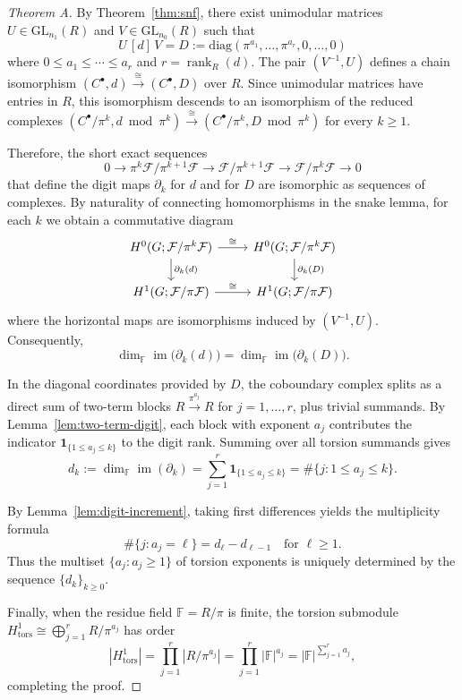 \documentclass[11pt]{amsart}
\theoremstyle{plain}
\theoremstyle{definition}
\newcommand{\Ring}{R}                          %
\newcommand{\unif}{\pi}                        %
\newcommand{\sheaf}[1]{\mathcal{#1}}                  %
\newcommand{\tors}{\mathrm{tors}}
\newcommand{\Digit}[1]{\partial_{#1}}%
\newcommand{\coboundary}{d}                           %
\DeclareMathOperator{\im}{im}                         %
\DeclareMathOperator{\rank}{rank}
\begin{document}
\begin{proof}[Theorem A]
By Theorem~\ref{thm:snf}, there exist unimodular matrices $U \in \mathrm{GL}_{n_1}(\Ring)$ and $V \in \mathrm{GL}_{n_0}(\Ring)$ such that
\[
U\,[\coboundary]\,V = D := \mathrm{diag}(\unif^{a_1}, \ldots, \unif^{a_r}, 0, \ldots, 0)
\]
where $0 \le a_1 \le \cdots \le a_r$ and $r = \rank_{\Ring}(\coboundary)$. The pair $(V^{-1}, U)$ defines a chain isomorphism $(C^\bullet, \coboundary) \xrightarrow{\cong} (C^\bullet, D)$ over $\Ring$. Since unimodular matrices have entries in $\Ring$, this isomorphism descends to an isomorphism of the reduced complexes $(C^\bullet/\unif^k, \coboundary \bmod \unif^k) \xrightarrow{\cong} (C^\bullet/\unif^k, D \bmod \unif^k)$ for every $k \ge 1$.

Therefore, the short exact sequences
\[
0 \to \unif^k\sheaf{F}/\unif^{k+1}\sheaf{F} \to \sheaf{F}/\unif^{k+1}\sheaf{F} \to \sheaf{F}/\unif^k\sheaf{F} \to 0
\]
that define the digit maps $\Digit{k}$ for $\coboundary$ and for $D$ are isomorphic as sequences of complexes. By naturality of connecting homomorphisms in the snake lemma, for each $k$ we obtain a commutative diagram
\[
\begin{tikzcd}
H^0(G;\sheaf{F}/\unif^k\sheaf{F}) \arrow{r}{\cong} \arrow{d}{\Digit{k}(\coboundary)} &
H^0(G;\sheaf{F}/\unif^k\sheaf{F}) \arrow{d}{\Digit{k}(D)} \\
H^1(G;\sheaf{F}/\unif\sheaf{F}) \arrow{r}{\cong} &
H^1(G;\sheaf{F}/\unif\sheaf{F})
\end{tikzcd}
\]
where the horizontal maps are isomorphisms induced by $(V^{-1}, U)$. Consequently,
\[
\dim_{\mathbb{F}} \im\bigl(\Digit{k}(\coboundary)\bigr) = \dim_{\mathbb{F}} \im\bigl(\Digit{k}(D)\bigr).
\]

In the diagonal coordinates provided by $D$, the coboundary complex splits as a direct sum of two-term blocks $\Ring \xrightarrow{\unif^{a_j}} \Ring$ for $j = 1, \ldots, r$, plus trivial summands. By Lemma~\ref{lem:two-term-digit}, each block with exponent $a_j$ contributes the indicator $\mathbf{1}_{\{1 \le a_j \le k\}}$ to the digit rank. Summing over all torsion summands gives
\[
d_k := \dim_{\mathbb{F}} \im(\Digit{k}) = \sum_{j=1}^r \mathbf{1}_{\{1 \le a_j \le k\}} = \#\{j : 1 \le a_j \le k\}.
\]

By Lemma~\ref{lem:digit-increment}, taking first differences yields the multiplicity formula
\[
\#\{j : a_j = \ell\} = d_\ell - d_{\ell-1} \quad \text{for } \ell \ge 1.
\]
Thus the multiset $\{a_j : a_j \ge 1\}$ of torsion exponents is uniquely determined by the sequence $\{d_k\}_{k \ge 0}$.

Finally, when the residue field $\mathbb{F} = \Ring/\unif$ is finite, the torsion submodule $H^1_{\tors} \cong \bigoplus_{j=1}^r \Ring/\unif^{a_j}$ has order
\[
|H^1_{\tors}| = \prod_{j=1}^r |\Ring/\unif^{a_j}| = \prod_{j=1}^r |\mathbb{F}|^{a_j} = |\mathbb{F}|^{\sum_{j=1}^r a_j},
\]
completing the proof.
\end{proof}
\end{document}
